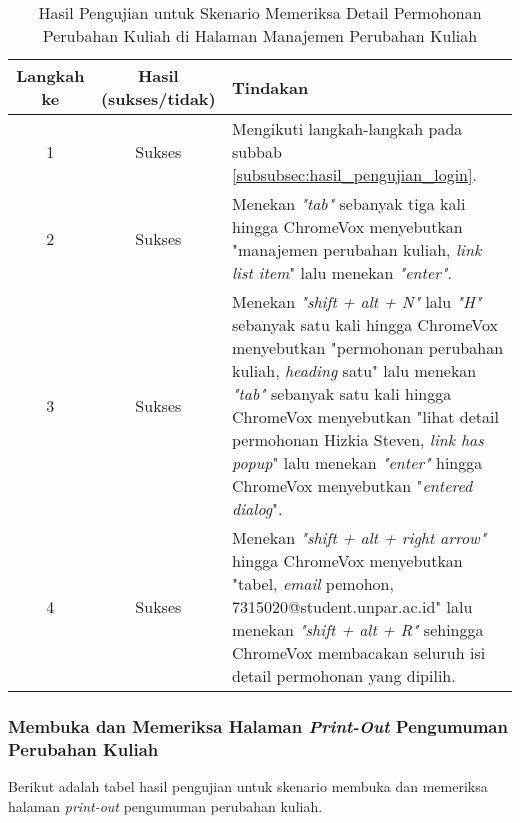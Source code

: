 \begin{table}[H]
    \centering 
    \caption{Hasil Pengujian untuk Skenario Memeriksa Detail Permohonan Perubahan Kuliah di Halaman Manajemen Perubahan Kuliah}
    \label{tab:hasil_pengujian_memeriksa_detail_permohonan_perubahan_kuliah_di_halaman_manajemen_perubahan_kuliah}
    \begin{tabular}{|c|c|p{10cm}|}
        \toprule
        Langkah ke & Hasil (sukses/tidak) & Tindakan \\

        \midrule
        1 & Sukses & Mengikuti langkah-langkah pada subbab \ref{subsubsec:hasil_pengujian_login}. \\
        2 & Sukses & Menekan \textit{"tab"} sebanyak tiga kali hingga ChromeVox menyebutkan "manajemen perubahan kuliah, \textit{link list item}" lalu menekan \textit{"enter"}. \\
        3 & Sukses & Menekan \textit{"shift + alt + N"} lalu \textit{"H"} sebanyak satu kali hingga ChromeVox menyebutkan "permohonan perubahan kuliah, \textit{heading} satu" lalu menekan \textit{"tab"} sebanyak satu kali hingga ChromeVox menyebutkan "lihat detail permohonan Hizkia Steven, \textit{link has popup}" lalu menekan \textit{"enter"} hingga ChromeVox menyebutkan "\textit{entered dialog}". \\
        4 & Sukses & Menekan \textit{"shift + alt + right arrow"} hingga ChromeVox menyebutkan "tabel, \textit{email} pemohon, 7315020@student.unpar.ac.id" lalu menekan \textit{"shift + alt + R"} sehingga ChromeVox membacakan seluruh isi detail permohonan yang dipilih. \\

        \bottomrule

    \end{tabular}
\end{table}

\subsubsection{Membuka dan Memeriksa Halaman \textit{Print-Out} Pengumuman Perubahan Kuliah}
\label{subsubsec:hasil_pengujian_membuka_dan_memeriksa_halaman_print_out_pengumuman_perubahan_kuliah}
Berikut adalah tabel hasil pengujian untuk skenario membuka dan memeriksa halaman \textit{print-out} pengumuman perubahan kuliah.

